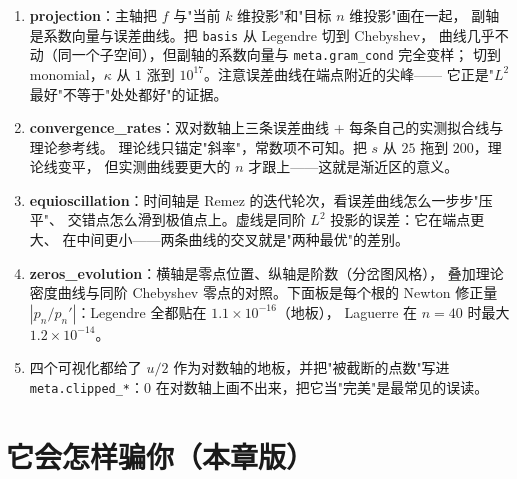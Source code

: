 \begin{enumerate}
  \item \textbf{projection}：主轴把 $f$ 与"当前 $k$ 维投影"和"目标 $n$ 维投影"画在一起，
        副轴是系数向量与误差曲线。把 \texttt{basis} 从 Legendre 切到 Chebyshev，
        曲线几乎不动（同一个子空间），但副轴的系数向量与 \texttt{meta.gram\_cond} 完全变样；
        切到 monomial，$\kappa$ 从 $1$ 涨到 $10^{17}$。注意误差曲线在端点附近的尖峰——
        它正是"$L^2$ 最好"不等于"处处都好"的证据。
  \item \textbf{convergence\_rates}：双对数轴上三条误差曲线 + 每条自己的实测拟合线与理论参考线。
        理论线只锚定"斜率"，常数项不可知。把 $s$ 从 $25$ 拖到 $200$，理论线变平，
        但实测曲线要更大的 $n$ 才跟上——这就是渐近区的意义。
  \item \textbf{equioscillation}：时间轴是 Remez 的迭代轮次，看误差曲线怎么一步步"压平"、
        交错点怎么滑到极值点上。虚线是同阶 $L^2$ 投影的误差：它在端点更大、
        在中间更小——两条曲线的交叉就是"两种最优"的差别。
  \item \textbf{zeros\_evolution}：横轴是零点位置、纵轴是阶数（分岔图风格），
        叠加理论密度曲线与同阶 Chebyshev 零点的对照。下面板是每个根的 Newton 修正量
        $|p_n/p_n'|$：Legendre 全都贴在 $1.1\times10^{-16}$（地板），
        Laguerre 在 $n=40$ 时最大 $1.2\times10^{-14}$。
  \item 四个可视化都给了 $u/2$ 作为对数轴的地板，并把"被截断的点数"写进
        \texttt{meta.clipped\_*}：$0$ 在对数轴上画不出来，把它当"完美"是最常见的误读。
\end{enumerate}



\section{它会怎样骗你（本章版）}

